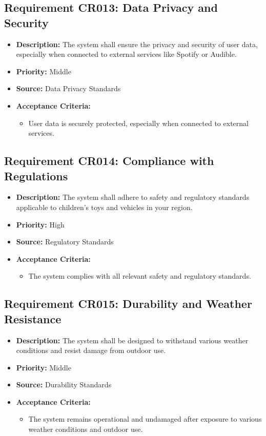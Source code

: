 \documentclass{article}
\begin{document}
	\subsection{Requirement CR013: Data Privacy and Security}
	\begin{itemize}
		\item \textbf{Description:} The system shall ensure the privacy and security of user data, especially when connected to external services like Spotify or Audible.
		\item \textbf{Priority:} Middle
		\item \textbf{Source:} Data Privacy Standards
		\item \textbf{Acceptance Criteria:}
		\begin{itemize}
			\item User data is securely protected, especially when connected to external services.
		\end{itemize}
	\end{itemize}
	
	\subsection{Requirement CR014: Compliance with Regulations}
	\begin{itemize}
		\item \textbf{Description:} The system shall adhere to safety and regulatory standards applicable to children's toys and vehicles in your region.
		\item \textbf{Priority:} High
		\item \textbf{Source:} Regulatory Standards
		\item \textbf{Acceptance Criteria:}
		\begin{itemize}
			\item The system complies with all relevant safety and regulatory standards.
		\end{itemize}
	\end{itemize}
	
	\subsection{Requirement CR015: Durability and Weather Resistance}
	\begin{itemize}
		\item \textbf{Description:} The system shall be designed to withstand various weather conditions and resist damage from outdoor use.
		\item \textbf{Priority:} Middle
		\item \textbf{Source:} Durability Standards
		\item \textbf{Acceptance Criteria:}
		\begin{itemize}
			\item The system remains operational and undamaged after exposure to various weather conditions and outdoor use.
		\end{itemize}
	\end{itemize}
	
\end{document}
